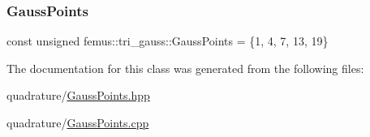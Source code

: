 \subsubsection{\texorpdfstring{Gauss\+Points}{GaussPoints}}
{\footnotesize\ttfamily const unsigned femus\+::tri\+\_\+gauss\+::\+Gauss\+Points = \{1, 4, 7, 13, 19\}\hspace{0.3cm}{\ttfamily [static]}}



The documentation for this class was generated from the following files\+:\begin{DoxyCompactItemize}
\item 
quadrature/\mbox{\hyperlink{_gauss_points_8hpp}{Gauss\+Points.\+hpp}}\item 
quadrature/\mbox{\hyperlink{_gauss_points_8cpp}{Gauss\+Points.\+cpp}}\end{DoxyCompactItemize}
